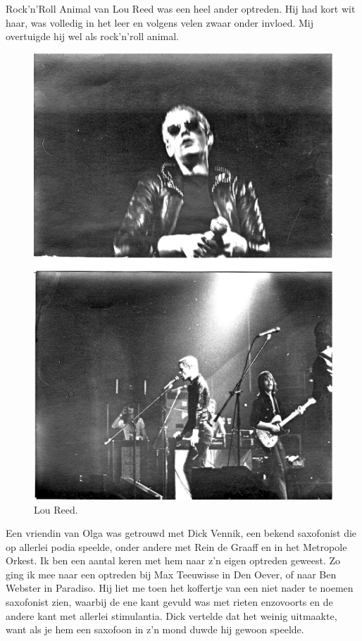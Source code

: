 \documentclass[10pt,twoside, openright]{memoir}
\begin{document}
Rock'n'Roll Animal van Lou Reed was een heel ander optreden. Hij had kort wit haar, was volledig in het leer en volgens velen zwaar onder invloed. Mij overtuigde hij wel als rock'n'roll animal.

\begin{figure}
\includegraphics[width=\textwidth]{img/ch31/reed}
\caption*{\footnotesize Lou Reed.}
\end{figure}

Een vriendin van Olga was getrouwd met Dick Vennik, een bekend saxofonist die op allerlei podia speelde, onder andere met Rein de Graaff en in het Metropole Orkest. Ik ben een aantal keren met hem naar z’n eigen optreden geweest. Zo ging ik mee naar een optreden bij Max Teeuwisse in Den Oever, of naar Ben Webster in Paradiso. Hij liet me toen het koffertje van een niet nader te noemen saxofonist zien, waarbij de ene kant gevuld was met rieten enzovoorts en de andere kant met allerlei stimulantia. Dick vertelde dat het weinig uitmaakte, want als je hem een saxofoon in z’n mond duwde hij gewoon speelde.
\end{document}
